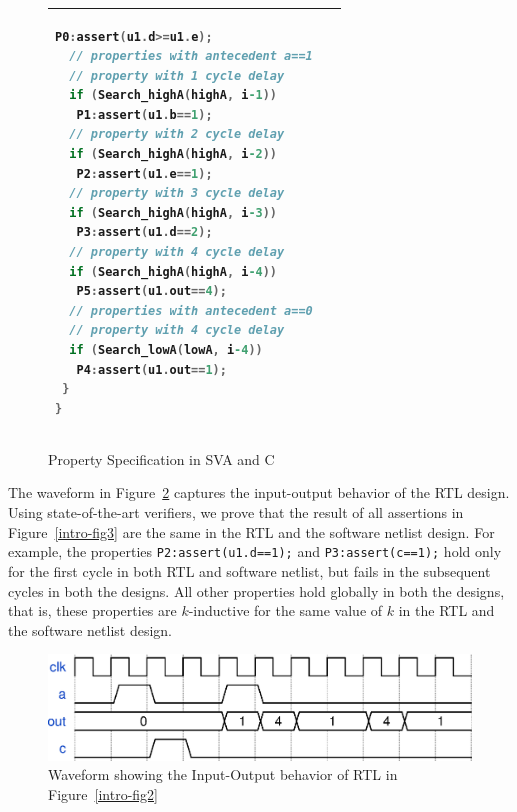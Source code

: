 \begin{figure}[bth]
\begin{center}
\begin{tabular}{@{}ll@{}}
\begin{lstlisting}[mathescape=true,language=C,basicstyle=\scriptsize\ttfamily]
  P0:assert(u1.d>=u1.e);
  // properties with antecedent a==1 
  // property with 1 cycle delay
  if (Search_highA(highA, i-1)) 
   P1:assert(u1.b==1);
  // property with 2 cycle delay
  if (Search_highA(highA, i-2))
   P2:assert(u1.e==1); 
  // property with 3 cycle delay
  if (Search_highA(highA, i-3))
   P3:assert(u1.d==2); 
  // property with 4 cycle delay
  if (Search_highA(highA, i-4))
   P5:assert(u1.out==4); 
  // properties with antecedent a==0
  // property with 4 cycle delay
  if (Search_lowA(lowA, i-4)) 
   P4:assert(u1.out==1);
 }
}
\end{lstlisting}\\
\hline
\end{tabular}
	\caption{Property Specification in SVA and C}
\label{fig:sva}
\end{center}
\end{figure}

The waveform in Figure~\ref{intro-waveform} captures the input-output behavior of the RTL design. 
Using state-of-the-art verifiers, we prove that the result of all assertions 
in Figure~\ref{intro-fig3} are the same in the RTL and the software netlist design. 
%
For example, the properties \texttt{P2:assert(u1.d==1);} and \texttt{P3:assert(c==1);} 
hold only for the first cycle in both RTL and software netlist, but fails in the 
subsequent cycles in both the designs.  All other properties 
hold globally in both the designs, that is, these properties are $k$-inductive 
for the same value of $k$ in the RTL and the software netlist design.
%
\begin{figure} 
\begin{center}
  \includegraphics[width=\columnwidth]{figures/example/waveform1.eps}%
	\caption{Waveform showing the Input-Output behavior of RTL in Figure~\ref{intro-fig2}}
\label{intro-waveform}
\end{center}
\end{figure}
%

